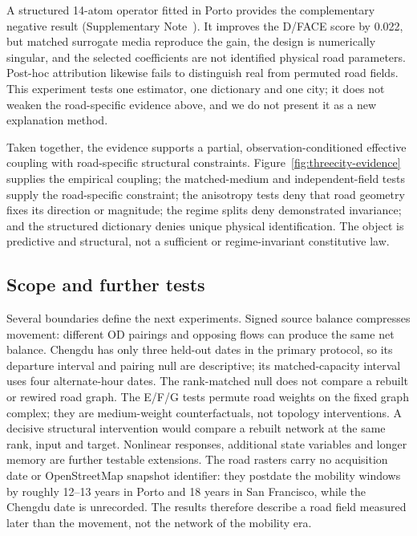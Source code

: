 \documentclass[11pt]{article}
\begin{document}
A structured 14-atom operator fitted in Porto provides the complementary negative result (Supplementary Note~). It improves the D/FACE score by 0.022, but matched surrogate media reproduce the gain, the design is numerically singular, and the selected coefficients are not identified physical road parameters. Post-hoc attribution likewise fails to distinguish real from permuted road fields. This experiment tests one estimator, one dictionary and one city; it does not weaken the road-specific evidence above, and we do not present it as a new explanation method.

Taken together, the evidence supports a partial, observation-conditioned effective coupling with road-specific structural constraints. Figure~\ref{fig:threecity-evidence} supplies the empirical coupling; the matched-medium and independent-field tests supply the road-specific constraint; the anisotropy tests deny that road geometry fixes its direction or magnitude; the regime splits deny demonstrated invariance; and the structured dictionary denies unique physical identification. The object is predictive and structural, not a sufficient or regime-invariant constitutive law.

\subsection{Scope and further tests}

Several boundaries define the next experiments. Signed source balance compresses movement: different OD pairings and opposing flows can produce the same net balance. Chengdu has only three held-out dates in the primary protocol, so its departure interval and pairing null are descriptive; its matched-capacity interval uses four alternate-hour dates. The rank-matched null does not compare a rebuilt or rewired road graph. The E/F/G tests permute road weights on the fixed graph complex; they are medium-weight counterfactuals, not topology interventions. A decisive structural intervention would compare a rebuilt network at the same rank, input and target. Nonlinear responses, additional state variables and longer memory are further testable extensions. The road rasters carry no acquisition date or OpenStreetMap snapshot identifier: they postdate the mobility windows by roughly 12--13 years in Porto and 18 years in San Francisco, while the Chengdu date is unrecorded. The results therefore describe a road field measured later than the movement, not the network of the mobility era.
\end{document}
